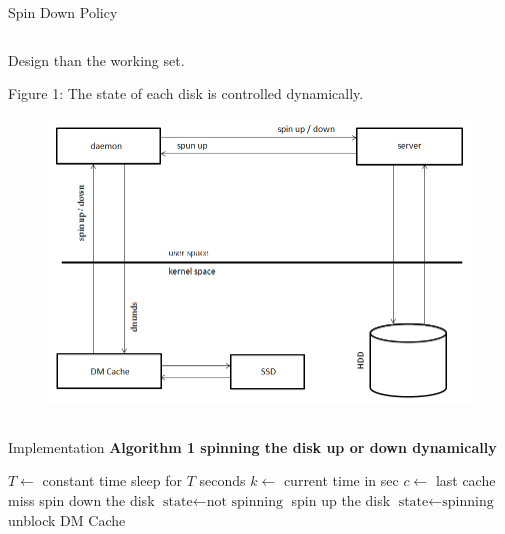 \documentclass[final]{beamer}
\newlength{\onecolwid}
\newlength{\twocolwid}
\begin{document}
\begin{frame}[t]
\begin{columns}[t]
\begin{column}{\twocolwid}
\begin{alertblock}{Spin Down Policy}
\begin{column}{\onecolwid}
\begin{block}{Design}
			    than the working set. \\
			\vspace{15pt}
			\raggedright Figure 1: The state of each disk is controlled dynamically.
			\vspace{15pt}
			\begin{figure}
			    \centering \includegraphics{drawing.png}
			    \label{fig:struct}
			\end{figure}
		    \end{block}
		\end{column}
		\begin{column}{\onecolwid}
		    \begin{block}{Implementation}
			\bf Algorithm 1 \rm spinning the disk up or down dynamically \\
			\algrenewcommand{}
			\begin{algorithmic}[1]
			    \State $T\gets$ constant time
				    \State sleep for $T$ seconds
					\State $k\gets$ current time in sec
					\State $c\gets$ last cache miss
					    \State spin down the disk
					    \State $\text{state}\gets \text{not spinning}$
					\EndIf
				    \Else {}
					    \State spin up the disk
					    \State $\text{state} \gets \text{spinning}$
					    \State unblock DM Cache
					\EndIf
				    \EndIf
				\EndWhile
			    \EndProcedure
			\end{algorithmic}
		    \end{block}
		\end{column}

\end{alertblock}
\end{column}
\end{columns}
\end{frame}
\end{document}
